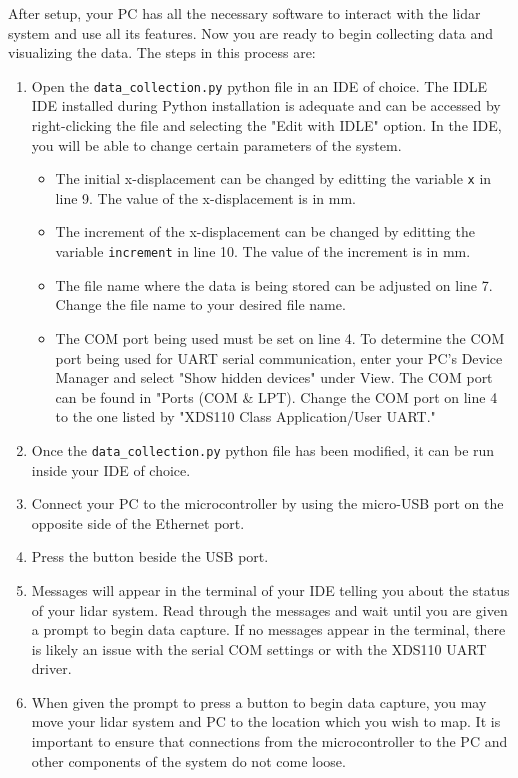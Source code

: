 \documentclass[12pt]{article}
\begin{document}
\fussy
After setup, your PC has all the necessary software to interact with the lidar system and use all its features. Now you are ready to begin collecting data and visualizing the data. The steps in this process are:
\begin{enumerate}
    \item Open the \texttt{data\_collection.py} python file in an IDE of choice. The IDLE IDE installed during Python installation is adequate and can be accessed by right-clicking the file and selecting the "Edit with IDLE" option. In the IDE, you will be able to change certain parameters of the system.
    \begin{itemize}[noitemsep,topsep=0pt]
        \item The initial x-displacement can be changed by editting the variable \texttt{x} in line 9. The value of the x-displacement is in mm.
        \item The increment of the x-displacement can be changed by editting the variable \texttt{increment} in line 10. The value of the increment is in mm.
        \item The file name where the data is being stored can be adjusted on line 7. Change the file name to your desired file name.
        \item The COM port being used must be set on line 4. To determine the COM port being used for UART serial communication, enter your PC's Device Manager and select "Show hidden devices" under View. The COM port can be found in "Ports (COM \& LPT). Change the COM port on line 4 to the one listed by "XDS110 Class Application/User UART."
    \end{itemize}
    \item Once the \texttt{data\_collection.py} python file has been modified, it can be run inside your IDE of choice.
    \item Connect your PC to the microcontroller by using the micro-USB port on the opposite side of the Ethernet port.
    \item Press the button beside the USB port.
    \item Messages will appear in the terminal of your IDE telling you about the status of your lidar system. Read through the messages and wait until you are given a prompt to begin data capture. If no messages appear in the terminal, there is likely an issue with the serial COM settings or with the XDS110 UART driver.
    \item When given the prompt to press a button to begin data capture, you may move your lidar system and PC to the location which you wish to map. It is important to ensure that connections from the microcontroller to the PC and other components of the system do not come loose.

\end{enumerate}
\end{document}
